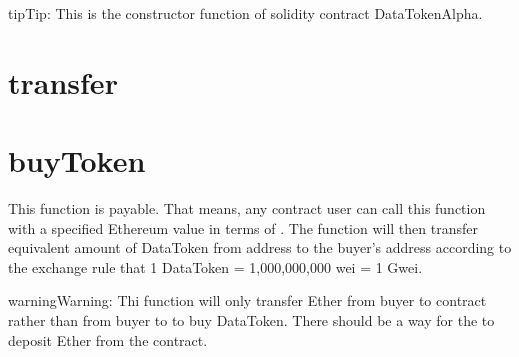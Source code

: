 \documentclass[letterpaper,10pt,english]{sphinxmanual}
\begin{document}
\begin{sphinxadmonition}{tip}{Tip:}
This is the constructor function of solidity contract DataTokenAlpha.
\end{sphinxadmonition}


\section{transfer}
\label{\detokenize{index:id3}}
%
\begin{sphinxVerbatim}[commandchars=\\\{\}]
    
\end{sphinxVerbatim}


\section{buyToken}
\label{\detokenize{index:buytoken}}
%
\begin{sphinxVerbatim}[commandchars=\\\{\},numbers=left,firstnumber=1,stepnumber=1]
 
 
          
     
\end{sphinxVerbatim}

This function is payable. That means, any contract user can call this function with a specified Ethereum value in terms of .
The function will then transfer equivalent amount of DataToken from  address to the buyer’s address according to
the exchange rule that 1 DataToken = 1,000,000,000 wei = 1 Gwei.

\begin{sphinxadmonition}{warning}{Warning:}
Thi function will only transfer Ether from buyer to contract rather than from buyer to  to buy DataToken. There should be a way for the  to deposit Ether from the contract.
\end{sphinxadmonition}
\end{document}
